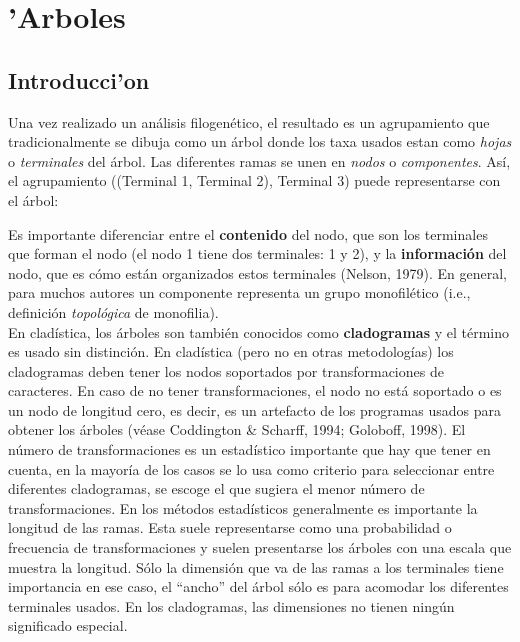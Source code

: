\chapter{'Arboles}
\section*{Introducci'on}
\thispagestyle{empty}
\large{\textsf{Una vez realizado un an\'alisis filogen\'etico,  %
el resultado es un agrupamiento que tradicionalmente se dibuja como un \'arbol donde los taxa usados estan como \emph{hojas} o \emph{terminales} del \'arbol. Las diferentes ramas se unen en \emph{nodos} o \emph{componentes}. As\'i, el agrupamiento ((Terminal 1, Terminal 2), Terminal 3) puede representarse con el \'arbol:}}\vspace*{0.7cm}
 \begin{center}
%
%


\end{center}\vspace*{0.7cm}

\textsf{\large{Es importante diferenciar entre el \textbf{contenido} 
del nodo, que son los terminales que forman el nodo (el nodo 1 tiene 
dos terminales: 1 y 2), y la \textbf{informaci\'on} del nodo, que es 
c\'omo est\'an organizados estos terminales (Nelson, 1979). En general, 
para muchos autores un componente representa un grupo monofil\'etico 
(i.e., definici\'on \emph{topol\'ogica} de monofilia).\\ En clad\'istica, 
los \'arboles son tambi\'en conocidos como \textbf{cladogramas} y el 
t\'ermino es usado sin distinci\'on. En clad\'istica (pero no en otras 
metodolog\'ias) los cladogramas deben tener los nodos soportados por 
transformaciones de caracteres. En caso de no tener 
transformaciones, el nodo no est\'a soportado o es un nodo de longitud 
cero, es decir, es un artefacto de los programas usados para obtener 
los \'arboles (v\'ease Coddington \& Scharff, 1994; Goloboff, 1998). 
El n\'umero de transformaciones es un estad\'istico importante que hay 
que tener en cuenta, en la mayor\'ia de los casos se lo usa como 
criterio para seleccionar entre diferentes cladogramas, se escoge el 
que sugiera el  menor n\'umero de transformaciones. En los m\'etodos 
estad\'isticos generalmente es importante la longitud de las ramas. 
Esta suele representarse como una probabilidad o frecuencia de 
transformaciones y suelen presentarse los \'arboles con una escala 
que muestra la longitud. S\'olo la dimensi\'on que va de las ramas a los 
terminales tiene importancia en ese caso, el ``ancho'' del \'arbol 
s\'olo es para acomodar los diferentes terminales usados. En los 
cladogramas, las dimensiones no tienen ning\'un significado 
especial.}}

